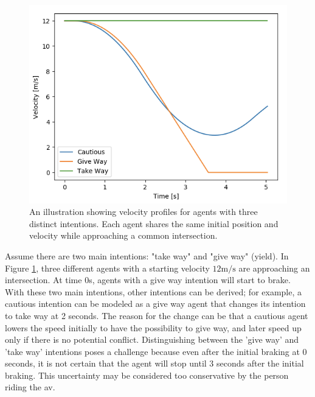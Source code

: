 \begin{figure}[h]
	\centering
	\includegraphics[width=0.6\columnwidth]{YourThesis/papers/mpc/figures/velocity_profiles_agents.png}

	\caption{An illustration showing velocity profiles for agents with three distinct intentions. Each agent shares the same initial position and velocity while approaching a common intersection.}
	\label{fig:intro_intention_profiles}
\end{figure}


Assume there are two main intentions: "take way" and "give way" (yield). In Figure \ref{fig:intro_intention_profiles}, three different agents with a starting velocity $12\mathrm{m/s}$ are approaching an intersection. At time $0$s, agents with a give way intention will start to brake. With these two main intentions, other intentions can be derived; for example, a cautious intention can be modeled as a give way agent that changes its intention to take way at 2 seconds. The reason for the change can be that a cautious agent lowers the speed initially to have the possibility to give way, and later speed up only if there is no potential conflict.
Distinguishing between the 'give way' and 'take way' intentions poses a challenge because even after the initial braking at 0 seconds, it is not certain that the agent will stop until 3 seconds after the initial braking. This uncertainty may be considered too conservative by the person riding the \gls{av}. 

